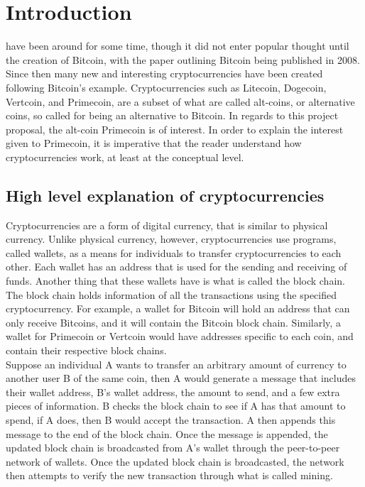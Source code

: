 \documentclass[journal]{IEEEtran}
\begin{document}
\section{Introduction}
% 
% 
% 
% 
 have been around for some time, though it did not enter popular thought until the creation of Bitcoin, with the paper outlining Bitcoin being published in 2008. Since then many new and
interesting cryptocurrencies have been created following Bitcoin's example.
Cryptocurrencies such as Litecoin, Dogecoin, Vertcoin, and Primecoin, are a subset of what are called alt-coins, or alternative coins, so called for being an alternative to Bitcoin. In regards to this project proposal, the alt-coin Primecoin is of interest. In order to explain the interest given to Primecoin, it is imperative that the reader understand how cryptocurrencies work, at least at the conceptual level.

\subsection{High level explanation of cryptocurrencies}
Cryptocurrencies are a form of digital currency, that is similar to physical currency. Unlike physical currency, however, cryptocurrencies use programs, called wallets, as a means for individuals to transfer cryptocurrencies to each other. Each wallet has an address that is used for the sending and receiving of funds. Another thing that these wallets have is what is called the block chain. The block chain holds information of all the transactions using the specified cryptocurrency. For example, a wallet for Bitcoin will hold an address that can only receive Bitcoins, and it will contain the Bitcoin block chain. Similarly, a wallet for Primecoin or Vertcoin would have addresses specific to each coin, and contain their respective block chains.\\

Suppose an individual A wants to transfer an arbitrary amount of currency to another user B of the same coin, then A would generate a message that includes their wallet address, B's wallet address, the amount to send, and a few extra pieces of information. B checks the block chain to see if A has that amount to spend, if A does, then B would accept the transaction. A then appends this message to the end of the block chain. Once the message is appended, the updated block chain is broadcasted from A's wallet through the peer-to-peer network of wallets. Once the updated block chain is broadcasted, the network then attempts to verify the new transaction through what is called mining.\\
\end{document}
